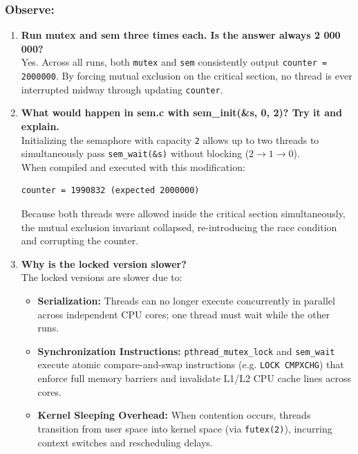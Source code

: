 \documentclass{labreport}
\begin{document}
\subsubsection*{Observe:}
\begin{enumerate}[leftmargin=*]
    \item \textbf{Run mutex and sem three times each. Is the answer always 2 000 000?}\\[0.2em]
    Yes. Across all runs, both \texttt{mutex} and \texttt{sem} consistently output \texttt{counter = 2000000}. By forcing mutual exclusion on the critical section, no thread is ever interrupted midway through updating \texttt{counter}.

    \item \textbf{What would happen in sem.c with sem\_init(\&s, 0, 2)? Try it and explain.}\\[0.2em]
    Initializing the semaphore with capacity \texttt{2} allows up to two threads to simultaneously pass \texttt{sem\_wait(\&s)} without blocking ($2 \to 1 \to 0$).\\
    When compiled and executed with this modification:
    \begin{lstlisting}[style=bash]
counter = 1990832 (expected 2000000)
    \end{lstlisting}
    Because both threads were allowed inside the critical section simultaneously, the mutual exclusion invariant collapsed, re-introducing the race condition and corrupting the counter.

    \item \textbf{Why is the locked version slower?}\\[0.2em]
    The locked versions are slower due to:
    \begin{itemize}[noitemsep]
        \item \textbf{Serialization:} Threads can no longer execute concurrently in parallel across independent CPU cores; one thread must wait while the other runs.
        \item \textbf{Synchronization Instructions:} \texttt{pthread\_mutex\_lock} and \texttt{sem\_wait} execute atomic compare-and-swap instructions (e.g. \texttt{LOCK CMPXCHG}) that enforce full memory barriers and invalidate L1/L2 CPU cache lines across cores.
        \item \textbf{Kernel Sleeping Overhead:} When contention occurs, threads transition from user space into kernel space (via \texttt{futex(2)}), incurring context switches and rescheduling delays.
    \end{itemize}
\end{enumerate}
\end{document}
